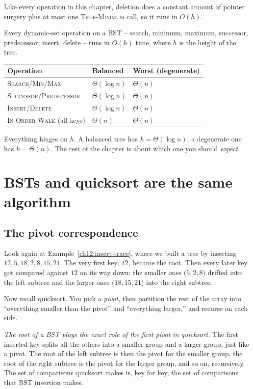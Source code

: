 Like every operation in this chapter, deletion does a constant amount of pointer surgery plus
at most one \textsc{Tree-Minimum} call, so it runs in $O(h)$.

\begin{complexitybox}
Every dynamic-set operation on a BST -- search, minimum, maximum, successor, predecessor,
insert, delete -- runs in $O(h)$ time, where $h$ is the height of the tree.
\begin{center}
\begin{tabular}{lll}
\toprule
Operation & Balanced & Worst (degenerate) \\
\midrule
\textsc{Search}/\textsc{Min}/\textsc{Max} & $\Theta(\log n)$ & $\Theta(n)$ \\
\textsc{Successor}/\textsc{Predecessor}   & $\Theta(\log n)$ & $\Theta(n)$ \\
\textsc{Insert}/\textsc{Delete}           & $\Theta(\log n)$ & $\Theta(n)$ \\
\textsc{In-Order-Walk} (all keys)         & $\Theta(n)$      & $\Theta(n)$ \\
\bottomrule
\end{tabular}
\end{center}
Everything hinges on $h$. A balanced tree has $h = \Theta(\log n)$; a degenerate one has
$h = \Theta(n)$. The rest of the chapter is about which one you should \emph{expect}.
\end{complexitybox}

\section{BSTs and quicksort are the same algorithm}

\subsection{The pivot correspondence}

Look again at Example~\ref{ch12:insert-trace}, where we built a tree by inserting
$12,5,18,2,8,15,21$. The very first key, $12$, became the root. Then every later key got
compared against $12$ on its way down: the smaller ones ($5,2,8$) drifted into the left
subtree and the larger ones ($18,15,21$) into the right subtree.

Now recall quicksort. You pick a \emph{pivot}, then partition the rest of the array into
``everything smaller than the pivot'' and ``everything larger,'' and recurse on each side.

\emph{The root of a BST plays the exact role of the first pivot in
quicksort.} The first inserted key splits all the others into a smaller group and a larger group, just
like a pivot. The root of the left subtree is then the pivot for the smaller group, the root
of the right subtree is the pivot for the larger group, and so on, recursively. The set of
comparisons quicksort makes is, key for key, the set of comparisons that BST insertion makes.

